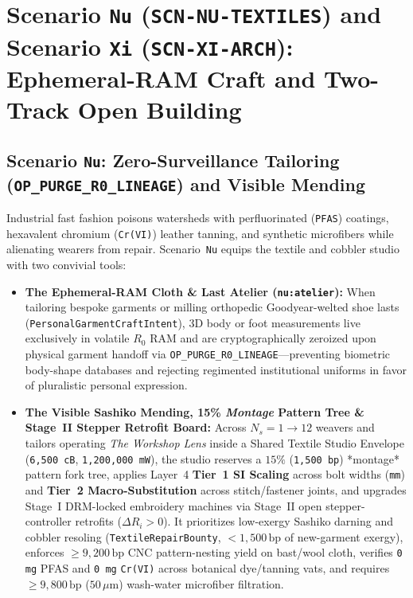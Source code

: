 \section{Scenario \texttt{Nu} (\texttt{SCN-NU-TEXTILES}) and Scenario \texttt{Xi} (\texttt{SCN-XI-ARCH}): Ephemeral-RAM Craft and Two-Track Open Building}
\label{sec:wave-d-nu-xi}

\subsection{Scenario \texttt{Nu}: Zero-Surveillance Tailoring (\texttt{OP\_PURGE\_R0\_LINEAGE}) and Visible Mending}

Industrial fast fashion poisons watersheds with perfluorinated (\texttt{PFAS}) coatings, hexavalent chromium (\texttt{Cr(VI)}) leather tanning, and synthetic microfibers while alienating wearers from repair. Scenario~\texttt{Nu} equips the textile and cobbler studio with two convivial tools:
\begin{itemize}
    \item \textbf{The Ephemeral-RAM Cloth \& Last Atelier (\texttt{nu:atelier}):} When tailoring bespoke garments or milling orthopedic Goodyear-welted shoe lasts (\texttt{PersonalGarmentCraftIntent}), 3D body or foot measurements live exclusively in volatile $R_0$ RAM and are cryptographically zeroized upon physical garment handoff via \texttt{OP\_PURGE\_R0\_LINEAGE}---preventing biometric body-shape databases and rejecting regimented institutional uniforms in favor of pluralistic personal expression.
    \item \textbf{The Visible Sashiko Mending, 15\% \textit{Montage} Pattern Tree \& Stage~II Stepper Retrofit Board:} Across $N_s = 1 \to 12$ weavers and tailors operating \textit{The Workshop Lens} inside a Shared Textile Studio Envelope (\texttt{6,500 cB}, \texttt{1,200,000 mW}), the studio reserves a $15\%$ (\texttt{1,500 bp}) *montage* pattern fork tree, applies Layer~4 \textbf{Tier~1 SI Scaling} across bolt widths (\texttt{mm}) and \textbf{Tier~2 Macro-Substitution} across stitch/fastener joints, and upgrades Stage~I DRM-locked embroidery machines via Stage~II open stepper-controller retrofits ($\Delta R_i > 0$). It prioritizes low-exergy Sashiko darning and cobbler resoling (\texttt{TextileRepairBounty}, $< 1{,}500\,\mathrm{bp}$ of new-garment exergy), enforces $\ge 9{,}200\,\mathrm{bp}$ CNC pattern-nesting yield on bast/wool cloth, verifies \texttt{0 mg} PFAS and \texttt{0 mg} \texttt{Cr(VI)} across botanical dye/tanning vats, and requires $\ge 9{,}800\,\mathrm{bp}$ ($50\,\mu\mathrm{m}$) wash-water microfiber filtration.
\end{itemize}

